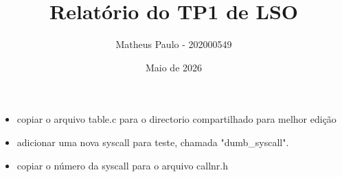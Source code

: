 \documentclass{article}
\begin{document}
\title{Relatório do TP1 de LSO}
\author{Matheus Paulo - 202000549}
\date{Maio de 2026}
\maketitle

\begin{itemize}
    \item copiar o arquivo table.c para o directorio compartilhado para melhor edição
    \item adicionar uma nova syscall para teste, chamada "dumb_syscall".
    \item copiar o número da syscall para o arquivo callnr.h
\end{itemize}
\end{document}
